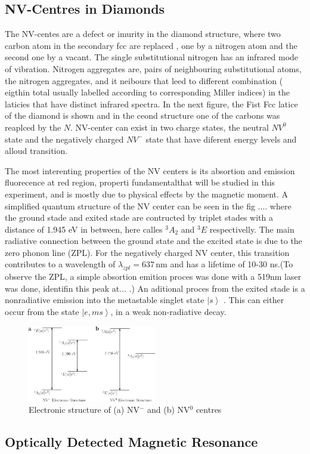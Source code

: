 \subsection{NV-Centres in Diamonds}
\label{sec:nvcentres}
 The NV-centes are a defect or imurity in the diamond structure, where two carbon atom in the secondary fcc are replaced , one by a nitrogen atom and the second one by a  vacant. The single substitutional nitrogen has an infrared mode of vibration. Nitrogen aggregates are, pairs of neighbouring substitutional atoms, the nitrogen aggregates, and it neibours that leed to different combination ( eigthin total usually labelled according to corresponding Miller indices) in the laticies that have distinct infrared spectra. In the next figure, the Fist Fcc latice of the diamond is shown and in the ceond structure one of the carbons was reaplced by the $N$. NV-center can exist in two charge states, the neutral $NV^{0}$ state and the negatively charged $NV^{-}$ state that have diferent energy levels and alloud transition.
 
The most interenting properties of the NV centers is its absortion and emission fluorecence at red region, properti fundamentalthat will be studied in this experiment, and is mostly due to physical effects by the magnetic moment. A simplified quantum structure of the NV center can be seen in the fig .... where the ground stade and exited stade are contructed by triplet stades with a distance of 1.945 eV in between, here calles $^{3}A_{2}$ and $^{3}E$  respectivelly. The main radiative connection between the ground state and the excited state is due to the zero phonon line (ZPL). For the negatively charged NV center, this transition contributes to a wavelength of $\lambda_{zpl} = 637\,\mathrm{nm}$ and has a lifetime of 10-30 ns.(To observe the ZPL, a simple absortion emition proces was done with a 519nm laser was done, identifin this peak at... .) 
An aditional proces from the exited stade is a nonradiative emission into the metastable singlet state $\left|s\right\rangle$ . This can either occur from the state $\left| e,ms\right\rangle$, in a weak non-radiative decay.

\begin{figure}
	\centering
	\includegraphics[width=0.5\textwidth]{../figures/nv-centre.png}
	\caption{Electronic structure of (a) NV$^-$ and (b) NV$^0$ centres \cite{doherty}}
	\label{fig:nvcentres}
\end{figure}


\subsection{Optically Detected Magnetic Resonance}







